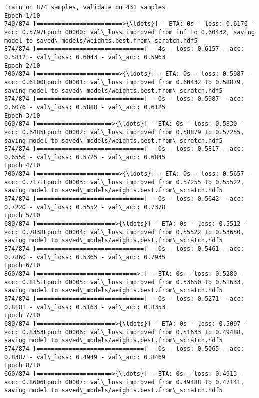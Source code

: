 \documentclass[11pt]{article}
\begin{document}
    \begin{Verbatim}[commandchars=\\\{\}]
Train on 874 samples, validate on 431 samples
Epoch 1/10
740/874 [========================>{\ldots}] - ETA: 0s - loss: 0.6170 - acc: 0.5797Epoch 00000: val\_loss improved from inf to 0.60432, saving model to saved\_models/weights.best.from\_scratch.hdf5
874/874 [==============================] - 4s - loss: 0.6157 - acc: 0.5812 - val\_loss: 0.6043 - val\_acc: 0.5963
Epoch 2/10
700/874 [=======================>{\ldots}] - ETA: 0s - loss: 0.5987 - acc: 0.6100Epoch 00001: val\_loss improved from 0.60432 to 0.58879, saving model to saved\_models/weights.best.from\_scratch.hdf5
874/874 [==============================] - 0s - loss: 0.5987 - acc: 0.6076 - val\_loss: 0.5888 - val\_acc: 0.6125
Epoch 3/10
660/874 [=====================>{\ldots}] - ETA: 0s - loss: 0.5830 - acc: 0.6485Epoch 00002: val\_loss improved from 0.58879 to 0.57255, saving model to saved\_models/weights.best.from\_scratch.hdf5
874/874 [==============================] - 0s - loss: 0.5817 - acc: 0.6556 - val\_loss: 0.5725 - val\_acc: 0.6845
Epoch 4/10
700/874 [=======================>{\ldots}] - ETA: 0s - loss: 0.5657 - acc: 0.7171Epoch 00003: val\_loss improved from 0.57255 to 0.55522, saving model to saved\_models/weights.best.from\_scratch.hdf5
874/874 [==============================] - 0s - loss: 0.5642 - acc: 0.7220 - val\_loss: 0.5552 - val\_acc: 0.7378
Epoch 5/10
680/874 [======================>{\ldots}] - ETA: 0s - loss: 0.5512 - acc: 0.7838Epoch 00004: val\_loss improved from 0.55522 to 0.53650, saving model to saved\_models/weights.best.from\_scratch.hdf5
874/874 [==============================] - 0s - loss: 0.5461 - acc: 0.7860 - val\_loss: 0.5365 - val\_acc: 0.7935
Epoch 6/10
860/874 [============================>.] - ETA: 0s - loss: 0.5280 - acc: 0.8151Epoch 00005: val\_loss improved from 0.53650 to 0.51633, saving model to saved\_models/weights.best.from\_scratch.hdf5
874/874 [==============================] - 0s - loss: 0.5271 - acc: 0.8181 - val\_loss: 0.5163 - val\_acc: 0.8353
Epoch 7/10
680/874 [======================>{\ldots}] - ETA: 0s - loss: 0.5097 - acc: 0.8353Epoch 00006: val\_loss improved from 0.51633 to 0.49488, saving model to saved\_models/weights.best.from\_scratch.hdf5
874/874 [==============================] - 0s - loss: 0.5065 - acc: 0.8387 - val\_loss: 0.4949 - val\_acc: 0.8469
Epoch 8/10
660/874 [=====================>{\ldots}] - ETA: 0s - loss: 0.4913 - acc: 0.8606Epoch 00007: val\_loss improved from 0.49488 to 0.47141, saving model to saved\_models/weights.best.from\_scratch.hdf5

\end{Verbatim}
\end{document}
